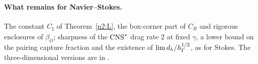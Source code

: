 \paragraph{What remains for Navier--Stokes.} The constant $C_\sharp$ of Theorem~\ref{n2:L}, the box-corner part of $C_R$ and rigorous enclosures of $\beta_O$; sharpness of the $\mathrm{CNS}^\ast$ drag rate $2$ at fixed $\gamma$, a lower bound on the pairing capture fraction and the existence of $\lim d_h/h_\Gamma^{1/2}$, as for Stokes. The three-dimensional versions are in \cite{PadhiThreeD}.
